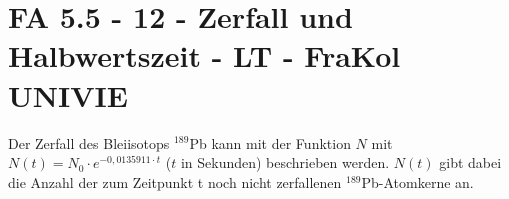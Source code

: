 \section{FA 5.5 - 12 - Zerfall und Halbwertszeit - LT - FraKol UNIVIE}

\begin{beispiel}[FA 5.5]{1}
Der Zerfall des Bleiisotops $^{189}$Pb kann mit der Funktion $N$ mit
$N(t) = N_0 \cdot e^{-0,0135911\cdot t}$ ($t$ in Sekunden) beschrieben werden.
$N(t)$ gibt dabei die Anzahl der zum Zeitpunkt t noch nicht zerfallenen $^{189}$Pb-Atomkerne an.

\end{beispiel}